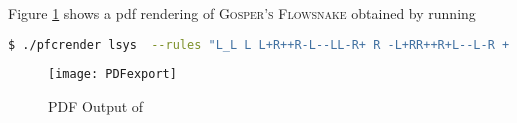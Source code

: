 Figure \ref{fig:plugpdf} shows a pdf rendering of \textsc{Gosper's Flowsnake} obtained by running
\begin{lstlisting}[language=bash]
$ ./pfcrender lsys  --rules "L_L L L+R++R-L--LL-R+ R -L+RR++R+L--L-R + + - - _ _ ~ ~" --sw 2 --sl 10  --it 4 --rd 0.5 --ia -60 --a 60 pdf --batch
\end{lstlisting}

\begin{figure}
	\texttt{[image: PDFexport]}
	\caption{PDF Output of }
	\label{fig:plugpdf}
\end{figure}
